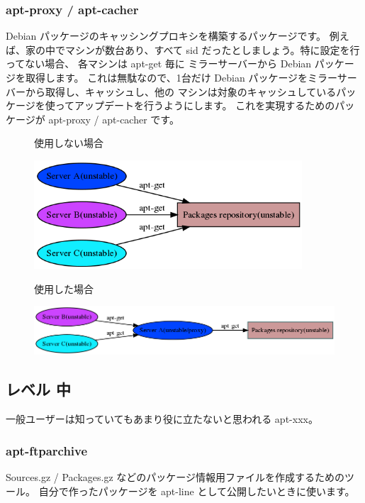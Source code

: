 \documentclass[mingoth,a4paper]{jsarticle}
\begin{document}
\subsubsection{apt-proxy / apt-cacher}
 Debian パッケージのキャッシングプロキシを構築するパッケージです。
 例えば、家の中でマシンが数台あり、すべて sid だったとしましょう。特に設定を行ってない場合、
 各マシンは apt-get 毎に ミラーサーバーから Debian パッケージを取得します。
 これは無駄なので、1台だけ Debian パッケージをミラーサーバーから取得し、キャッシュし、他の
 マシンは対象のキャッシュしているパッケージを使ってアップデートを行うようにします。
 これを実現するためのパッケージが apt-proxy / apt-cacher です。
 \begin{figure}[h]
 \begin{center}
使用しない場合

 \includegraphics[width=10cm]{image200709/apt-proxy.png}
 \end{center}
 \end{figure}

 \begin{figure}[h]
 \begin{center}
使用した場合

 \includegraphics[width=15cm]{image200709/apt-proxy-e.png}
 \end{center}
 \end{figure}

\subsection{レベル 中}
 一般ユーザーは知っていてもあまり役に立たないと思われる apt-xxx。
\subsubsection{apt-ftparchive}
 Sources.gz / Packages.gz などのパッケージ情報用ファイルを作成するためのツール。
 自分で作ったパッケージを apt-line として公開したいときに使います。
\begin{commandline}
\end{commandline}
\end{document}
